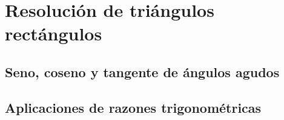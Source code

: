 \thispagestyle{plain}
\section{Resolución de triángulos rectángulos}
\subsection{Seno, coseno y tangente de ángulos agudos}
\subsection{Aplicaciones de razones trigonométricas}